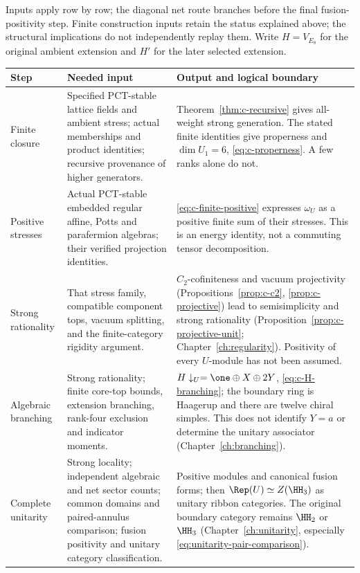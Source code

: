 Inputs apply row by row; the diagonal net route branches before
the final fusion-positivity step.
Finite construction inputs retain the status explained above; the
structural implications do not independently replay them.
Write $H=V_{E_8}$ for the original ambient extension and $H'$ for
the later selected extension.

\begingroup
\small
\renewcommand{\arraystretch}{1.12}
\begin{longtable}{@{}>{\raggedright\arraybackslash}p{}
 >{\raggedright\arraybackslash}p{}
 >{\raggedright\arraybackslash}p{}@{}}
\toprule
Step & Needed input & Output and logical boundary\\
\midrule
\endhead
Finite closure &
Specified PCT-stable lattice fields and ambient stress;
actual memberships and product identities;
recursive provenance of higher generators. &
Theorem~\ref{thm:c-recursive} gives all-weight strong generation.
The stated finite identities give properness and $\dim U_1=6$,
\eqref{eq:c-properness}. A few ranks alone do not.\\[5pt]

Positive stresses &
Actual PCT-stable embedded regular affine, Potts and parafermion
algebras; their verified projection identities. &
\eqref{eq:c-finite-positive} expresses $\omega_U$ as a positive
finite sum of their stresses. This is an energy identity,
not a commuting tensor decomposition.\\[5pt]

Strong rationality &
That stress family, compatible component tops, vacuum splitting,
and the finite-category rigidity argument. &
$C_2$-cofiniteness and vacuum projectivity
(Propositions~\ref{prop:c-c2}, \ref{prop:c-projective}) lead to
semisimplicity and strong rationality
(Proposition~\ref{prop:c-projective-unit};
Chapter~\ref{ch:regularity}). Positivity of every $U$-module
has not been assumed.\\[5pt]

Algebraic branching &
Strong rationality; finite core-top bounds, extension branching,
rank-four exclusion and indicator moments. &
$H\downarrow_U=\one\oplus X\oplus2Y$,
\eqref{eq:c-H-branching}; the boundary ring is Haagerup and there
are twelve chiral simples. This does not identify $Y=a$
or determine the unitary associator
(Chapter~\ref{ch:branching}).\\[5pt]

Complete unitarity &
Strong locality; independent algebraic and net sector counts;
common domains and paired-annulus comparison; fusion positivity
and unitary category classification. &
Positive modules and canonical fusion forms; then
$\Rep(U)\simeq Z(\HH_3)$ as unitary ribbon categories.
The original boundary category remains
$\HH_2$ or $\HH_3$
(Chapter~\ref{ch:unitarity}, especially
\eqref{eq:unitarity-pair-comparison}).\\[5pt]


\end{longtable}

